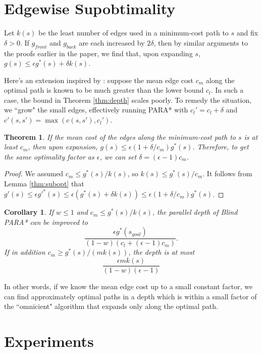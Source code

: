\documentclass[letterpaper]{article}
\newtheorem{thm}{Theorem}
\newtheorem{cor}{Corollary}
\begin{document}
\section{Edgewise Supobtimality}

Let $k(s)$ be the least number of edges used in a minimum-cost path to $s$ and fix $\delta > 0$. If $g_{front}$ and $g_{back}$ are each increased by $2\delta$, then by similar arguments to the proofs earlier in the paper, we find that, upon expanding $s$, $g(s) \le \epsilon g^*(s) + \delta k(s)$.

Here's an extension inspired by \cite{klein1997randomized}: suppose the mean edge cost $c_m$ along the optimal path is known to be much greater than the lower bound $c_l$. In such a case, the bound in Theorem \ref{thm:depth} scales poorly. To remedy the situation, we ``grow" the small edges, effectively running PARA* with $c_l' = c_l + \delta$ and $c'(s,s') = \max(c(s,s'), c_l')$.

\begin{thm}
\label{thm:delta}
If the mean cost of the edges along the minimum-cost path to $s$ is at least $c_m$, then upon expansion, $g(s) \le \epsilon(1+\delta/c_m)g^*(s)$. Therefore, to get the same optimality factor as $\epsilon$, we can set $\delta = (\epsilon-1)c_m$.
\end{thm}

\begin{proof}
We assumed $c_m \le g^*(s) / k(s)$, so $k(s) \le g^*(s) / c_m$.
It follows from Lemma \ref{thm:subopt} that $g'(s) \le \epsilon g'^*(s) \le \epsilon(g^*(s) + \delta k(s)) \le \epsilon(1+\delta/c_m)g^*(s)$.
\end{proof}

\begin{cor}
\label{cor:delta}
If $w \le 1$ and $c_m \le g^*(s) / k(s)$, the parallel depth of Blind PARA* can be improved to
\[\frac{\epsilon g^*(s_{goal})}{(1-w)(c_l+(\epsilon-1)c_m)}.\]
If in addition $c_m \ge g^*(s)/(mk(s))$, the depth is at most
\[\frac{\epsilon mk(s)}{(1-w)(\epsilon-1)}\]
\end{cor}

In other words, if we know the mean edge cost up to a small constant factor, we can find approximately optimal paths in a depth which is within a small factor of the ``omnicient" algorithm that expands only along the optimal path.

\section{Experiments}
\end{document}
